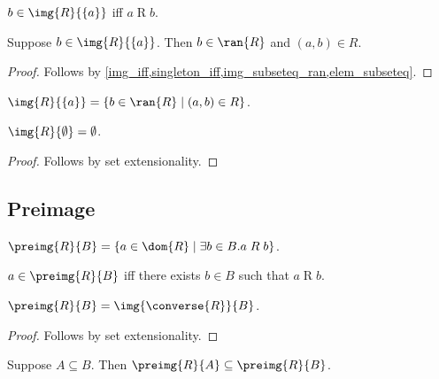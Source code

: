 \begin{proposition}\label{img_singleton_iff}
    $b\in \img{R}{\{a\}}$ iff $a\mathrel{R}b$.
\end{proposition}

\begin{proposition}\label{img_singleton_intro}
    Suppose $b\in\img{R}{\{a\}}$.
    Then $b\in\ran{R}$ and $(a,b)\in R$.
\end{proposition}
\begin{proof}
    Follows by \cref{img_iff,singleton_iff,img_subseteq_ran,elem_subseteq}.
\end{proof}

\begin{proposition}\label{img_singleton}
    $\img{R}{\{a\}} = \{b\in\ran{R}\mid (a,b)\in R \}$.
\end{proposition}

\begin{proposition}\label{img_emptyset}
    $\img{R}{\emptyset} = \emptyset$.
\end{proposition}
\begin{proof}
    Follows by set extensionality.
\end{proof}

\subsection{Preimage}

\begin{definition}\label{preimg}
    $\preimg{R}{B} = \{a\in\dom{R} \mid \exists b\in B. a\mathrel{R} b \}$.
\end{definition}

\begin{proposition}\label{preimg_iff}
    $a\in\preimg{R}{B}$ iff there exists $b\in B$ such that $a\mathrel{R} b$.
\end{proposition}

\begin{proposition}\label{preim_eq_img_of_converse}
    $\preimg{R}{B} = \img{\converse{R}}{B}$.
\end{proposition}
\begin{proof}
    Follows by set extensionality.
\end{proof}

\begin{proposition}\label{preimg_subseteq}
    Suppose $A\subseteq B$.
    Then $\preimg{R}{A}\subseteq \preimg{R}{B}$.
\end{proposition}


